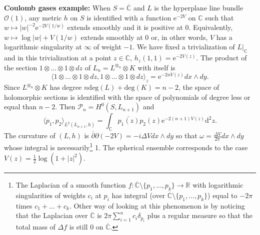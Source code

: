\documentclass[10pt,reqno]{amsart}
\numberwithin{equation}{section}
\numberwithin{figure}{section}
\theoremstyle{plain}
\newcommand{\<}{\langle}
\renewcommand{\>}{\rangle}
\begin{document}
\noindent
\textbf{Coulomb gases example:}
When $S=\overline{\mathbb C}$ and $L$ is the hyperplane line
bundle $\mathcal O(1)$, any metric $h$ on $S$
is identified with a function
$\mathrm{e}^{-2V}$ on $\mathbb C$ such that
$w \mapsto |w|^{-2} \mathrm{e}^{-2V(1/w)}$ extends smoothly
and it is positive at $0$.
Equivalently, $w \mapsto \log|w| + V(1/w)$
extends smoothly at $0$ or, in other words,
$V$ has a logarithmic singularity
at $\infty$ of weight $-1$.
We have fixed a trivialization
of $L|_{\mathbb C}$ and in this trivialization at
a point $z \in \mathbb C$,
$h_z(1,1) = \mathrm{e}^{-2V(z)}$.
The product of
the section $1 \otimes \dots \otimes 1 \otimes 
dz$ of $L_n=L^{\otimes_n} \otimes K$ with itself is
\[\langle 
1 \otimes \dots \otimes 1 \otimes 
dz , 1 \otimes \dots \otimes 1 \otimes 
dz \rangle_z = \mathrm{e}^{-2n V(z)} dx \wedge dy.\]
Since $L^{\otimes_n} \otimes K$
has degree $n \mathrm{deg}(L) + \mathrm{deg}(K)
= n - 2$, the space of holomorphic sections
is identified with
the space of polynomials of degree less or equal
than $n-2$.
Then $\mathcal P_{n} = H^0(S,L_{n+1})$ and
\[ \langle p_1, p_2 \rangle_{L^2(L_{n+1},h)}
= \int_{\mathbb C} \overline{p_1(z)}
p_2(z) \mathrm{e}^{-2(n+1)V(z)} \mathrm d^2 z.\]
The curvature 
of $(L,h)$ is 
$\overline{\partial} \partial (-2V)
= -i \Delta V dx \wedge dy$ 
so that $\omega = \frac{\Delta V}{2\pi} dx \wedge dy$ whose
integral is necessarily\footnote{The Laplacian
of a smooth function $f: \overline{\mathbb C}\setminus 
\{p_1,\dots,p_k\} \to \mathbb R$ 
with logarithmic singularities
of weights $c_i$ at $p_i$  has integral
(over $\overline{\mathbb C} \setminus \{p_1,\dots,p_k\}$)
equal to $-2\pi$ times $c_1+\dots+c_k$. 
Other way of looking at this phenomenon is
by noticing that the Laplacian over $\overline{\mathbb C}$
is $2\pi \sum_{i=1}^n c_i\delta_{p_i}$ 
plus a regular measure so that the total mass
of $\Delta f$ is still $0$ on
$\overline{\mathbb C}$.} 1.
The spherical ensemble corresponds to the case
$V(z) = \frac{1}{2}\log(1+|z|^2)$.

\medskip
\end{document}
